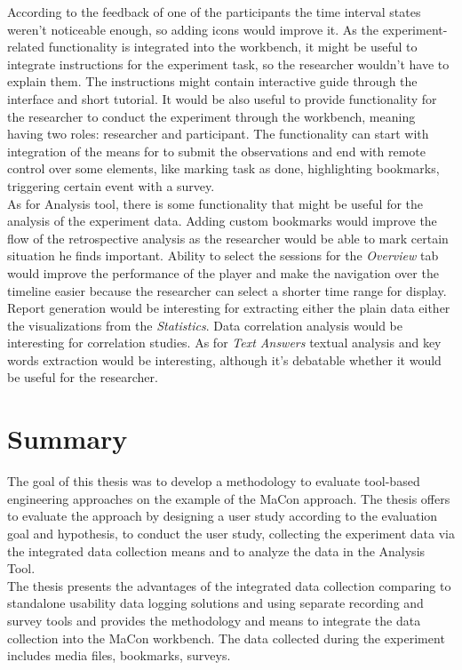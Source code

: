 According to the feedback of one of the participants the time interval states weren't noticeable enough, so adding icons would improve it. As  the experiment-related functionality is integrated into the workbench, it might be useful to integrate instructions for the experiment task, so the researcher wouldn't have to explain them. The instructions might contain interactive guide through the interface and short tutorial. It would be also useful to provide functionality for the researcher to conduct the experiment through the workbench, meaning having two roles: researcher and participant. The functionality can start with integration of the means for to submit the observations and end with remote control over some elements, like marking task as done, highlighting bookmarks, triggering certain event with a survey.\\

As for Analysis tool, there is some functionality that might be useful for the analysis of the experiment data. Adding custom bookmarks would improve the flow of the retrospective analysis as the researcher would be able to mark certain situation he finds important. Ability to select the sessions for the \textit{Overview} tab would improve the performance of the player and make the navigation over the timeline easier because the researcher can select a shorter time range for display.\\ 

Report generation would be interesting for extracting either the plain data either the visualizations from the \textit{Statistics}. Data correlation analysis would be interesting for correlation studies. As for \textit{Text Answers} textual analysis and key words extraction would be interesting, although it's debatable whether it would be useful for the researcher.\\  

\section{Summary}
The goal of this thesis was to develop a methodology to evaluate tool-based engineering approaches on the example of the MaCon approach. The thesis offers to evaluate the approach by designing a user study according to the evaluation goal and hypothesis, to conduct the user study, collecting the experiment data via the integrated data collection means and to analyze the data in the Analysis Tool.\\

The thesis presents the advantages of the integrated data collection comparing to standalone usability data logging solutions and using separate recording and survey tools and provides the methodology and means to integrate the data collection into the MaCon workbench. The data collected during the experiment includes media files, bookmarks, surveys.\\

